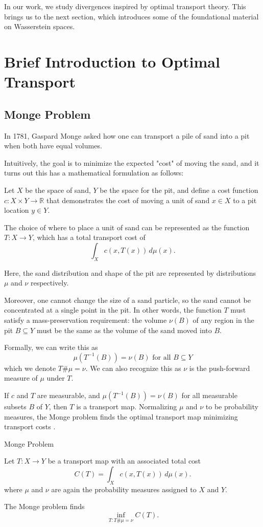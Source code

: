 In our work, we study divergences inspired by optimal transport theory. This brings us to the next section, which introduces some of the foundational material on Wasserstein spaces.

\section{Brief Introduction to Optimal Transport}

\subsection*{Monge Problem}

In 1781, Gaspard Monge asked how one can transport a pile of sand into a pit when both have equal volumes.

Intuitively, the goal is to minimize the expected "cost" of moving the sand, and it turns out this has a mathematical formulation as follows:

Let $X$ be the space of sand, $Y$ be the space for the pit, and define a cost function $c:X\times Y\to \mathbb{R}$ that demonstrates the cost of moving a unit of sand $x\in X$ to a pit location $y\in Y$.

The choice of where to place a unit of sand can be represented as the function $T:X\to Y$, which has a total transport cost of
\[
\int_{X} c(x,T(x))\,d\mu(x).
\]

Here, the sand distribution and shape of the pit are represented by distributions $\mu$ and $\nu$ respectively.

Moreover, one cannot change the size of a sand particle, so the sand cannot be concentrated at a single point in the pit. In other words, the function $T$ must satisfy a mass-preservation requirement: the volume $\nu(B)$ of any region in the pit $B\subseteq Y$ must be the same as the volume of the sand moved into $B$.

Formally, we can write this as
\[ 
\mu(T^{-1}(B))=\nu(B) \text{ for all } B\subseteq Y
\] which we denote $T\#\mu=\nu$. We can also recognize this as $\nu$ is the push-forward measure of $\mu$ under $T$.

If $c$ and $T$ are measurable, and $\mu(T^{-1}(B))=\nu(B)$ for all measurable subsets $B$ of $Y$, then $T$ is a transport map. Normalizing $\mu$ and $\nu$ to be probability measures, the Monge problem finds the optimal transport map minimizing transport costs \cite{Panaretos2020}. 

\begin{definition}{Monge Problem}
	
	Let $T:X\to Y$ be a transport map with an associated total cost \[
	C(T) = \int_{X} c(x,T(x)) \,d\mu(x).
	\] where $\mu$ and $\nu$ are again the probability measures assigned to $X$ and $Y$.
	
	The Monge problem finds
	\[
	\inf_{T:T\#\mu=\nu} C(T).
	\]
\end{definition}

